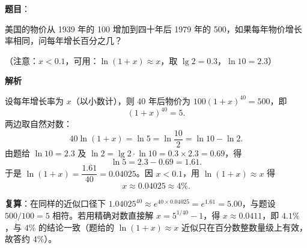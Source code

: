 \begin{answer}

\textbf{题目}：

美国的物价从 1939 年的 100 增加到四十年后 1979 年的 500，如果每年物价增长率相同，问每年增长百分之几？

（注意：$x<0.1$，可用：$\ln(1+x)\approx x$，取 $\lg 2=0.3$，$\ln 10=2.3$）

\textbf{解析}

设每年增长率为 $x$（以小数计），则 40 年后物价为 $100(1+x)^{40}=500$，即
\nopagebreak[4]
\[
(1+x)^{40}=5.
\]
两边取自然对数：
\nopagebreak[4]
\[
40\ln(1+x)=\ln 5=\ln\frac{10}2=\ln 10-\ln 2 .
\]
由题给 $\ln 10=2.3$ 及 $\ln 2=\lg 2\cdot\ln 10=0.3\times2.3=0.69$，得
\nopagebreak[4]
\[
\ln 5=2.3-0.69=1.61 .
\]
于是 $\ln(1+x)=\dfrac{1.61}{40}=0.04025$。因 $x<0.1$，用 $\ln(1+x)\approx x$ 得
\nopagebreak[4]
\[
x\approx0.04025\approx4\%.
\]

\textbf{复算}：在同样的近似口径下 $1.04025^{40}\approx e^{40\times0.04025}=e^{1.61}=5.00$，与题设 $500/100=5$ 相符。若用精确对数直接解 $x=5^{1/40}-1$，得 $x\approx0.0411$，即 $4.1\%$，与 $4\%$ 的结论一致（题给的 $\ln(1+x)\approx x$ 近似只在百分数整数量级上有效，故答约 $4\%$）。


\end{answer}
